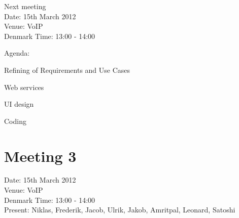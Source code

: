 Next meeting\\
Date: 15th March 2012\\
Venue: VoIP\\
Denmark Time: 13:00 - 14:00 
 
Agenda:
\begin{my_itemize}
\item Refining of Requirements and Use Cases

\item Web services

\item UI design

\item Coding

\end{my_itemize}

\pagebreak

\section{Meeting 3}
\label{Appendix_SMU_Meeting3}
Date: 15th March 2012\\
Venue: VoIP\\
Denmark Time: 13:00 - 14:00\\
Present: Niklas, Frederik, Jacob, Ulrik, Jakob, Amritpal, Leonard, Satoshi

